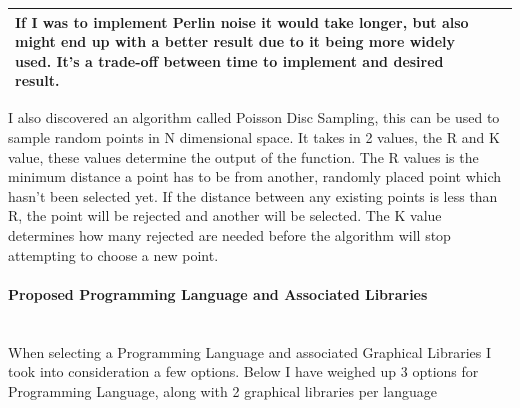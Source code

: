 \begin{flushleft}
\begin{flushleft}
\begin{tabular}{| C{6cm} | C{6cm} |}
                                If I was to implement Perlin noise it would take longer, but also might end up with a better result
                                due to it being more widely used. It's a trade-off between time to implement and desired result. \\
                                \hline
                            \end{tabular}
                        \end{flushleft}
                        
                        I also discovered an algorithm called Poisson Disc Sampling, this can be used to sample random points 
                        in N dimensional space. It takes in 2 values, the R and K value, these values determine the output of
                        the function. The R values is the minimum distance a point has to be from another, randomly placed point
                        which hasn't been selected yet. If the distance between any existing points is less than R, the point
                        will be rejected and another will be selected. The K value determines how many rejected are needed before 
                        the algorithm will stop attempting to choose a new point.
                        
                        \vspace{0.5cm}
                    \paragraph{Proposed Programming Language and Associated Libraries} \mbox{} \\
                        \vspace{0.2cm}
                        When selecting a Programming Language and associated Graphical Libraries I took into consideration a few options.
                        Below I have weighed up 3 options for Programming Language, along with 2 graphical libraries per language
                        

\end{flushleft}
